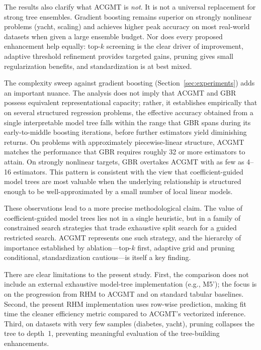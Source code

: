 \documentclass[11pt,a4paper]{article}
\begin{document}
The results also clarify what ACGMT is \emph{not}. It is not a universal replacement for strong tree ensembles. Gradient boosting remains superior on strongly nonlinear problems (yacht, scaling) and achieves higher peak accuracy on most real-world datasets when given a large ensemble budget. Nor does every proposed enhancement help equally: top-$k$ screening is the clear driver of improvement, adaptive threshold refinement provides targeted gains, pruning gives small regularization benefits, and standardization is at best mixed.

The complexity sweep against gradient boosting (Section~\ref{sec:experiments}) adds an important nuance. The analysis does not imply that ACGMT and GBR possess equivalent representational capacity; rather, it establishes empirically that on several structured regression problems, the effective accuracy obtained from a single interpretable model tree falls within the range that GBR spans during its early-to-middle boosting iterations, before further estimators yield diminishing returns. On problems with approximately piecewise-linear structure, ACGMT matches the performance that GBR requires roughly 32 or more estimators to attain. On strongly nonlinear targets, GBR overtakes ACGMT with as few as 4--16 estimators. This pattern is consistent with the view that coefficient-guided model trees are most valuable when the underlying relationship is structured enough to be well-approximated by a small number of local linear models.

These observations lead to a more precise methodological claim. The value of coefficient-guided model trees lies not in a single heuristic, but in a family of constrained search strategies that trade exhaustive split search for a guided restricted search. ACGMT represents one such strategy, and the hierarchy of importance established by ablation---top-$k$ first, adaptive grid and pruning conditional, standardization cautious---is itself a key finding.

There are clear limitations to the present study. First, the comparison does not include an external exhaustive model-tree implementation (e.g., M5'); the focus is on the progression from RHM to ACGMT and on standard tabular baselines. Second, the present RHM implementation uses row-wise prediction, making fit time the cleaner efficiency metric compared to ACGMT's vectorized inference. Third, on datasets with very few samples (diabetes, yacht), pruning collapses the tree to depth~1, preventing meaningful evaluation of the tree-building enhancements.
\end{document}
